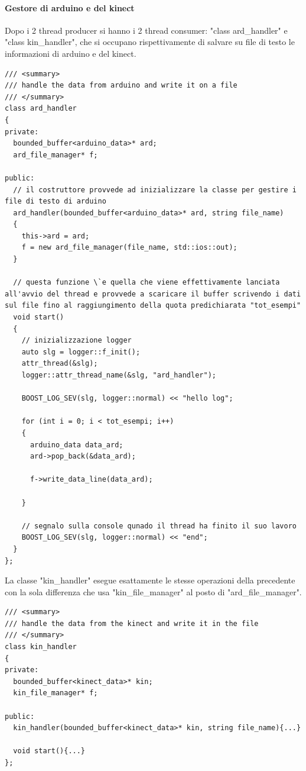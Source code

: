 \documentclass[10pt,a4paper]{article}
\begin{document}
\paragraph{Gestore di arduino e del kinect}
Dopo i 2 thread producer si hanno i 2 thread consumer: "class ard\_handler" e "class kin\_handler", che si occupano rispettivamente di salvare su file di testo le informazioni di arduino e del kinect. 
\begin{lstlisting}[style=mycpp, caption=librerie usate, captionpos=b]
/// <summary>
/// handle the data from arduino and write it on a file
/// </summary>
class ard_handler
{
private:
  bounded_buffer<arduino_data>* ard;
  ard_file_manager* f;

public:
  // il costruttore provvede ad inizializzare la classe per gestire i file di testo di arduino
  ard_handler(bounded_buffer<arduino_data>* ard, string file_name)
  {
    this->ard = ard;
    f = new ard_file_manager(file_name, std::ios::out);
  }

  // questa funzione \`e quella che viene effettivamente lanciata all'avvio del thread e provvede a scaricare il buffer scrivendo i dati sul file fino al raggiungimento della quota predichiarata "tot_esempi"
  void start()
  {
	// inizializzazione logger
    auto slg = logger::f_init();
    attr_thread(&slg);
    logger::attr_thread_name(&slg, "ard_handler");

    BOOST_LOG_SEV(slg, logger::normal) << "hello log";

    for (int i = 0; i < tot_esempi; i++)
    {
      arduino_data data_ard;
      ard->pop_back(&data_ard);

      f->write_data_line(data_ard);

    }
    
	// segnalo sulla console qunado il thread ha finito il suo lavoro
    BOOST_LOG_SEV(slg, logger::normal) << "end";
  }
};
\end{lstlisting}
%
%
La classe "kin\_handler" esegue esattamente le stesse operazioni della precedente con la sola differenza che usa "kin\_file\_manager" al posto di "ard\_file\_manager".
\begin{lstlisting}[style=mycpp, caption=librerie usate, captionpos=b]
/// <summary>
/// handle the data from the kinect and write it in the file
/// </summary>
class kin_handler
{
private:
  bounded_buffer<kinect_data>* kin;
  kin_file_manager* f;

public:
  kin_handler(bounded_buffer<kinect_data>* kin, string file_name){...}

  void start(){...}
};
\end{lstlisting}
%
%
\end{document}
